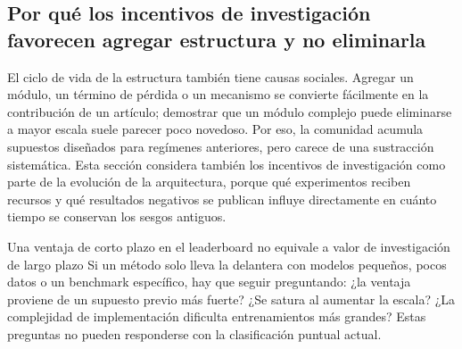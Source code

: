 
\subsection{Por qué los incentivos de investigación favorecen agregar estructura y no eliminarla}

El ciclo de vida de la estructura también tiene causas sociales. Agregar un módulo, un término de pérdida o un mecanismo se convierte fácilmente en la contribución de un artículo; demostrar que un módulo complejo puede eliminarse a mayor escala suele parecer poco novedoso. Por eso, la comunidad acumula supuestos diseñados para regímenes anteriores, pero carece de una sustracción sistemática. Esta sección considera también los incentivos de investigación como parte de la evolución de la arquitectura, porque qué experimentos reciben recursos y qué resultados negativos se publican influye directamente en cuánto tiempo se conservan los sesgos antiguos.


\begin{warningbox}{Una ventaja de corto plazo en el leaderboard no equivale a valor de investigación de largo plazo}
Si un método solo lleva la delantera con modelos pequeños, pocos datos o un benchmark específico, hay que seguir preguntando: ¿la ventaja proviene de un supuesto previo más fuerte? ¿Se satura al aumentar la escala? ¿La complejidad de implementación dificulta entrenamientos más grandes? Estas preguntas no pueden responderse con la clasificación puntual actual.
\end{warningbox}



